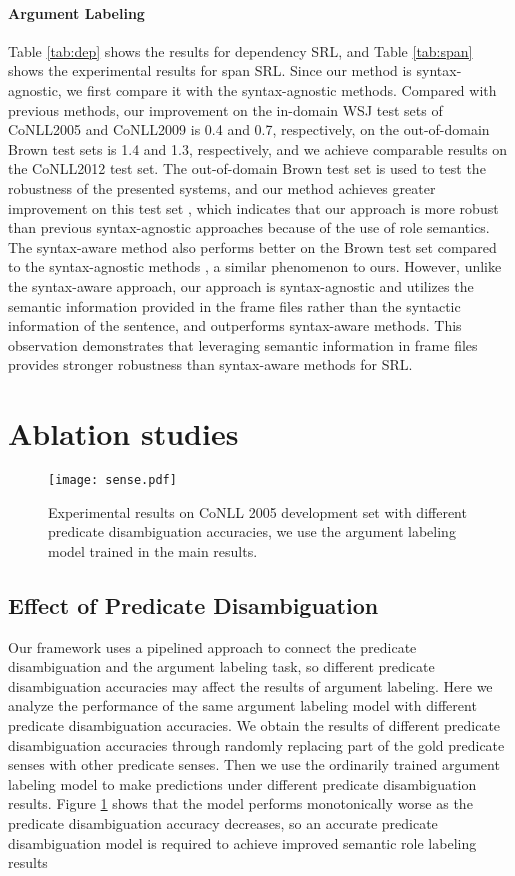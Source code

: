 \documentclass[11pt]{article}
\begin{document}
\paragraph{Argument Labeling}
Table \ref{tab:dep} shows the results for dependency SRL, and Table \ref{tab:span} shows the experimental results for span SRL. 
Since our method is syntax-agnostic, we first compare it with the syntax-agnostic methods. Compared with previous methods,
our improvement on the in-domain WSJ test sets of CoNLL2005 and CoNLL2009 is 0.4 and 0.7, respectively, on the out-of-domain Brown test sets is 1.4 and 1.3, respectively, and we achieve comparable results on the CoNLL2012 test set.
The out-of-domain Brown test set is used to test the robustness of the presented systems, and our method achieves greater improvement on this test set , which indicates that our approach is more robust than previous syntax-agnostic approaches because of the use of role semantics. The syntax-aware method \cite{Mohammadshahi2021SyntaxAwareGT} also performs better on the Brown test set compared to the syntax-agnostic methods \cite{shi2019simple}, a similar phenomenon to ours. However, unlike the syntax-aware approach, our approach is syntax-agnostic and utilizes the semantic information provided in the frame files rather than the syntactic information of the sentence, 
and outperforms syntax-aware methods. This observation demonstrates that leveraging semantic information in frame files provides stronger robustness than syntax-aware methods for SRL.


\section{Ablation studies}
\begin{figure}
    \centering
    \texttt{[image: sense.pdf]}
    \caption{Experimental results on CoNLL 2005 development set with different predicate disambiguation accuracies, we use the argument labeling model trained in the main results.}
    \label{fig:sense}
\end{figure}
\subsection{Effect of Predicate Disambiguation}

Our framework uses a pipelined approach to connect the predicate disambiguation and the argument labeling task, so different predicate disambiguation accuracies may affect the results of argument labeling. Here we analyze the performance of the same argument labeling model with different predicate disambiguation accuracies. We obtain the results of different predicate disambiguation accuracies through randomly replacing part of the gold predicate senses with other predicate senses. Then we use the ordinarily trained argument labeling model to make predictions under different predicate disambiguation results. Figure \ref{fig:sense} shows that the model performs monotonically worse as the predicate disambiguation accuracy decreases, so an accurate predicate disambiguation model is required to achieve improved semantic role labeling results
\par
\end{document}

